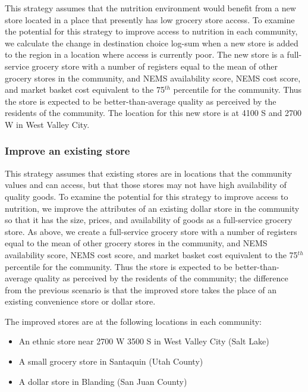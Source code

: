 \documentclass[
  letterpaper,
  number,
  review,
  3p]{elsarticle}
\providecommand{\tightlist}{%
  \setlength{\itemsep}{0pt}\setlength{\parskip}{0pt}}\usepackage{longtable,booktabs,array}
\begin{document}
This strategy assumes that the nutrition environment would benefit from
a new store located in a place that presently has low grocery store
access. To examine the potential for this strategy to improve access to
nutrition in each community, we calculate the change in destination
choice log-sum when a new store is added to the region in a location
where access is currently poor. The new store is a full-service grocery
store with a number of registers equal to the mean of other grocery
stores in the community, and NEMS availability score, NEMS cost score,
and market basket cost equivalent to the 75\(^{th}\) percentile for the
community. Thus the store is expected to be better-than-average quality
as perceived by the residents of the community. The location for this
new store is at 4100 S and 2700 W in West Valley City.

\subsubsection{Improve an existing
store}\label{improve-an-existing-store}

This strategy assumes that existing stores are in locations that the
community values and can access, but that those stores may not have high
availability of quality goods. To examine the potential for this
strategy to improve access to nutrition, we improve the attributes of an
existing dollar store in the community so that it has the size, prices,
and availability of goods as a full-service grocery store. As above, we
create a full-service grocery store with a number of registers equal to
the mean of other grocery stores in the community, and NEMS availability
score, NEMS cost score, and market basket cost equivalent to the
75\(^{th}\) percentile for the community. Thus the store is expected to
be better-than-average quality as perceived by the residents of the
community; the difference from the previous scenario is that the
improved store takes the place of an existing convenience store or
dollar store.

The improved stores are at the following locations in each community:

\begin{itemize}
\tightlist
\item
  An ethnic store near 2700 W 3500 S in West Valley City (Salt Lake)
\item
  A small grocery store in Santaquin (Utah County)
\item
  A dollar store in Blanding (San Juan County)
\end{itemize}
\end{document}
